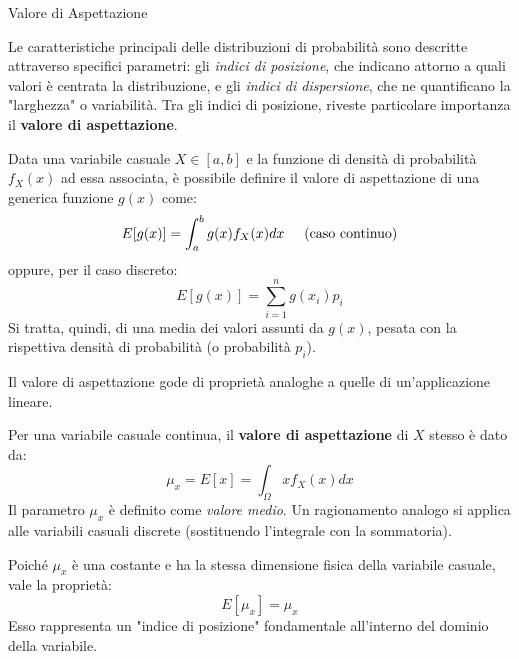\documentclass[openany,a4paper,12pt]{book}
\theoremstyle{remark}
\begin{document}
\begin{center}
\end{center}




\begin{bressan}{Valore di Aspettazione}

Le caratteristiche principali delle distribuzioni di probabilità sono descritte attraverso specifici parametri: gli \textit{indici di posizione}, che indicano attorno a quali valori è centrata la distribuzione, e gli \textit{indici di dispersione}, che ne quantificano la "larghezza" o variabilità.
Tra gli indici di posizione, riveste particolare importanza il \textbf{valore di aspettazione}.

Data una variabile casuale $X \in [a,b]$ e la funzione di densità di probabilità $f_X(x)$ ad essa associata, è possibile definire il valore di aspettazione di una generica funzione $g(x)$ come:
\[
E[g(x)]= \int_{a}^{b} g(x) f_X(x) dx \hspace{0.5cm} (\text{caso continuo})
\]
oppure, per il caso discreto:
\[
E[g(x)]=  \sum_{i=1}^{n} g(x_i) p_i
\]
Si tratta, quindi, di una media dei valori assunti da $g(x)$, pesata con la rispettiva densità di probabilità (o probabilità $p_i$).

Il valore di aspettazione gode di proprietà analoghe a quelle di un'applicazione lineare.

Per una variabile casuale continua, il \textbf{valore di aspettazione} di $X$ stesso è dato da:
\[
\mu_x = E[x] = \int_{\Omega}^{} x f_{X}(x) dx
\]
Il parametro $\mu_x$ è definito come \textit{valore medio}. Un ragionamento analogo si applica alle variabili casuali discrete (sostituendo l'integrale con la sommatoria).

Poiché $\mu_x$ è una costante e ha la stessa dimensione fisica della variabile casuale, vale la proprietà:
\[
E[\mu_x] = \mu_x
\]
Esso rappresenta un "indice di posizione" fondamentale all'interno del dominio della variabile.

\end{bressan}
\end{document}
